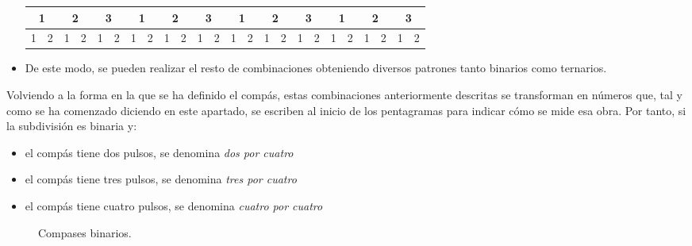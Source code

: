 \documentclass[a4paper, openright, 11pt, titlepage]{report}
\theoremstyle{definition}\newtheorem{defin}[propo]{Definition}
\theoremstyle{definition}\newtheorem{obser}[propo]{Remark}
\theoremstyle{definition}\newtheorem{ejem}[propo]{Ejemplo}
\theoremstyle{definition}\newtheorem{algoritmo}[propo]{Algoritmo}
\begin{document}
\begin{itemize}
    \begin{table}[H]
    \centering
    \begin{tabular}{|c|c|c|c|c|c|c|c|c|c|c|c|c|c|c|c|c|c|c|c|c|c|c|c|}
    \hline
        \multicolumn{2}{|c}{\cellcolor{acento}1} & \multicolumn{2}{|c}{2} & \multicolumn{2}{|c}{3} & \multicolumn{2}{|c}{\cellcolor{acento}1} & \multicolumn{2}{|c}{2} & \multicolumn{2}{|c}{3} & \multicolumn{2}{|c}{\cellcolor{acento}1} & \multicolumn{2}{|c}{2} & \multicolumn{2}{|c}{3} & \multicolumn{2}{|c}{\cellcolor{acento}1} & \multicolumn{2}{|c}{2} & \multicolumn{2}{|c|}{3} \\
    \hline
        \cellcolor{acento}1 & 2 & 1 & 2 & 1 & 2 & \cellcolor{acento}1 & 2 & 1 & 2 & 1 & 2 & \cellcolor{acento}1 & 2 & 1 & 2 & 1 & 2 & \cellcolor{acento}1 & 2 & 1 & 2 & 1 & 2\\
        \hline
    \end{tabular}
\end{table}
\item De este modo, se pueden realizar el resto de combinaciones obteniendo diversos patrones tanto binarios como ternarios.
\end{itemize}
Volviendo a la forma en la que se ha definido el compás, estas combinaciones anteriormente descritas se transforman en números que, tal y como se ha comenzado diciendo en este apartado, se escriben al inicio de los pentagramas para indicar cómo se mide esa obra. Por tanto, si la subdivisión es binaria y:
\begin{itemize}
    \item el compás tiene dos pulsos, se denomina \textit{dos por cuatro}
    \item el compás tiene tres pulsos, se denomina \textit{tres por cuatro}
    \item el compás tiene cuatro pulsos, se denomina \textit{cuatro por cuatro}
\end{itemize}
 \begin{figure}[H]
        \centering
         \hspace{1.7cm}
            \hspace{1.7cm}
            \hspace{1.7cm}
        \caption{Compases binarios.}
\end{figure}
\end{document}
